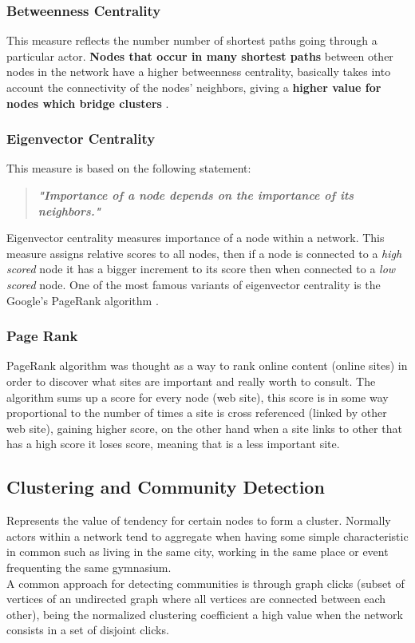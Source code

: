 \subsubsection*{Betweenness Centrality}
This measure reflects the number number of shortest paths going through a particular actor. \textbf{Nodes that
occur in many shortest paths} between other nodes in the network have a higher betweenness centrality, basically
takes into account the connectivity of the nodes' neighbors, giving a \textbf{higher value for nodes which bridge clusters} \citep{politaktivsna}.

\subsubsection*{Eigenvector Centrality}
This measure is based on the following statement:

\begin{quote}
\textbf{\textit{"Importance of a node depends on the importance of its neighbors."}}
\end{quote}

Eigenvector centrality \citep{politaktivsna} measures importance of a node within a network. This measure assigns relative scores to all nodes, then if
a node is connected to a \textit{high scored} node it has a bigger increment to its score then when connected to a \textit{low scored} node.
One of the most famous variants of eigenvector centrality is the Google's PageRank algorithm \citep{brin1998anatomy}.

\subsubsection*{Page Rank}
PageRank algorithm \citep{brin1998anatomy} was thought as a way to rank online content (online sites) in order to discover
what sites are important and really worth to consult. The algorithm sums up a score for every node (web site),
this score is in some way proportional to the number of times a site is cross referenced (linked by other web site), gaining higher score,
on the other hand when a site links to other that has a high score it loses score, meaning that is a less important site.

\subsection{Clustering and Community Detection}
Represents the value of tendency for certain nodes to form a cluster. Normally actors within a network tend to aggregate when having some
simple characteristic in common such as living in the same city, working in the same place or event frequenting the same gymnasium.\\
\indent A common approach for detecting communities is through graph clicks (subset of vertices of an
undirected graph where all vertices are connected between each other), being the normalized clustering coefficient a high value
when the network consists in a set of disjoint clicks.

